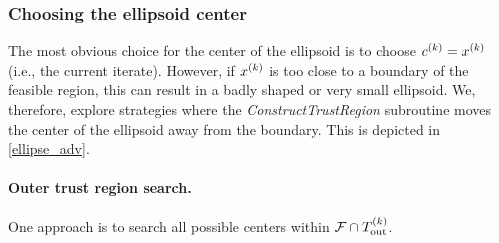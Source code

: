 \documentclass{article}
\begin{document}










\subsubsection{Choosing the ellipsoid center}
\label{center_searches}

The most obvious choice for the center of the ellipsoid is to choose $c^{(k)} = x^{(k)}$ (i.e., the current iterate).  
However, if $x^{(k)}$ is too close to a boundary of the feasible region, this can result in a badly shaped or very small ellipsoid.
We, therefore, explore strategies where the \emph{ConstructTrustRegion} subroutine moves the center of the ellipsoid away from the boundary. 
This is depicted in \cref{ellipse_adv}.



\paragraph{Outer trust region search.}

One approach is to search all possible centers within ${\mathcal F} \cap {T_{\text{out}}^{(k)}} $.  
\end{document}
